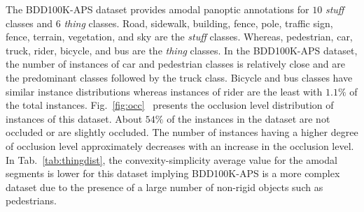 \documentclass[10pt,twocolumn,letterpaper]{article}
\newcommand{\figref}[1]{Fig.~\ref{#1}}
\newcommand{\tabref}[1]{Tab.~\ref{#1}}
\begin{document}
The BDD100K-APS dataset provides amodal panoptic annotations for $10$ \textit{stuff} classes and $6$ \textit{thing} classes. Road, sidewalk, building, fence, pole, traffic sign, fence, terrain, vegetation, and sky are the \textit{stuff} classes. Whereas, pedestrian, car, truck, rider, bicycle, and bus are the \textit{thing} classes. In the \mbox{BDD100K-APS} dataset, the number of instances of car and pedestrian classes is relatively close and are the predominant classes followed by the truck class.  Bicycle and bus classes have similar instance distributions whereas instances of rider are the least with $1.1\%$ of the total instances. \figref{fig:occ}~ presents the occlusion level distribution of instances of this dataset. About $54\%$ of the instances in the dataset are not occluded or are slightly occluded. The number of instances having a higher degree of occlusion level approximately decreases with an increase in the occlusion level. In \tabref{tab:thingdist}, the convexity-simplicity average value for the amodal segments is lower for this dataset implying BDD100K-APS is a more complex dataset due to the presence of a large number of non-rigid objects such as pedestrians.
\end{document}
